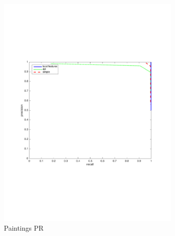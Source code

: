 \documentclass[english,12pt,a4paper,pdftex,elec,utf8, table]{aaltothesis}
\begin{document}
\begin{figure}[htb]
\begin{center}
\begin{subfigure}[b]{0.49\textwidth}
    \includegraphics[width=\textwidth]{figures/83scalePR.pdf}
    \caption{Paintings PR}
    \label{83rocthinglink}
  \end{subfigure}
  \begin{subfigure}[b]{0.49\textwidth}

\end{subfigure}
\end{center}
\end{figure}
\end{document}
